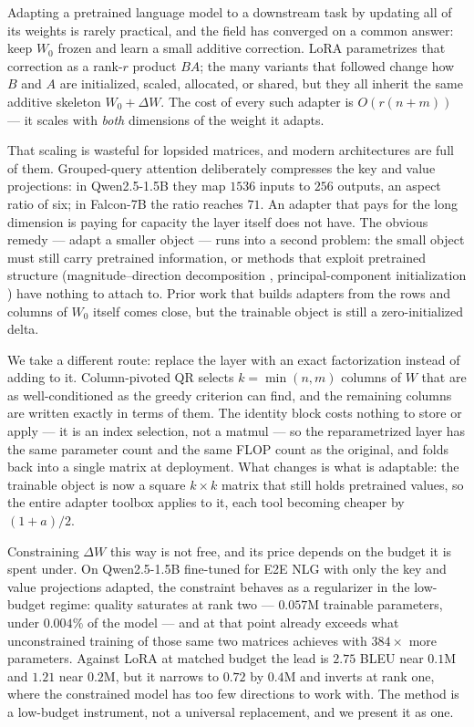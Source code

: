 \documentclass{article}
\begin{document}
Adapting a pretrained language model to a downstream task by updating all of
its weights is rarely practical, and the field has converged on a common
answer: keep $W_0$ frozen and learn a small additive correction. LoRA
\citep{hu2022lora} parametrizes that correction as a rank-$r$ product $BA$;
the many variants that followed change how $B$ and $A$ are initialized,
scaled, allocated, or shared, but they all inherit the same additive skeleton
$W_0 + \Delta W$. The cost of every such adapter is $O(r(n+m))$ --- it scales
with \emph{both} dimensions of the weight it adapts.

That scaling is wasteful for lopsided matrices, and modern architectures are
full of them. Grouped-query attention \citep{ainslie2023gqa} deliberately
compresses the key and value projections: in Qwen2.5-1.5B they map $1536$
inputs to $256$ outputs, an aspect ratio of six; in Falcon-7B the ratio
reaches $71$. An adapter that pays for the long dimension is paying for
capacity the layer itself does not have. The obvious remedy --- adapt a
smaller object --- runs into a second problem: the small object must still
carry pretrained information, or methods that exploit pretrained structure
(magnitude--direction decomposition \citep{liu2024dora}, principal-component
initialization \citep{meng2024pissa}) have nothing to attach to. Prior work
that builds adapters from the rows and columns of $W_0$ itself
\citep{wang2024pmss,pica2025} comes close, but the trainable object is still a
zero-initialized delta.

We take a different route: replace the layer with an exact factorization
instead of adding to it. Column-pivoted QR selects $k = \min(n,m)$ columns of
$W$ that are as well-conditioned as the greedy criterion can find, and the
remaining columns are written exactly in terms of them. The identity block
costs nothing to store or apply --- it is an index selection, not a matmul ---
so the reparametrized layer has the same parameter count and the same FLOP
count as the original, and folds back into a single matrix at deployment. What
changes is what is adaptable: the trainable object is now a square
$k \times k$ matrix that still holds pretrained values, so the entire adapter
toolbox applies to it, each tool becoming cheaper by $(1+a)/2$.

Constraining $\Delta W$ this way is not free, and its price depends on the
budget it is spent under. On Qwen2.5-1.5B fine-tuned for E2E NLG with only the
key and value projections adapted, the constraint behaves as a regularizer in
the low-budget regime: quality saturates at rank two --- $0.057$M trainable
parameters, under $0.004\%$ of the model --- and at that point already exceeds
what unconstrained training of those same two matrices achieves with $384\times$
more parameters. Against LoRA at matched budget the lead is $2.75$ BLEU near
$0.1$M and $1.21$ near $0.2$M, but it narrows to $0.72$ by $0.4$M and inverts
at rank one, where the constrained model has too few directions to work with.
The method is a low-budget instrument, not a universal replacement, and we
present it as one.
\end{document}
